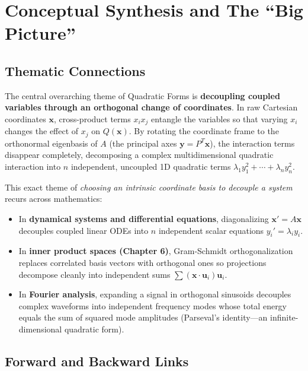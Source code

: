 \documentclass[11pt, letterpaper]{article}
\theoremstyle{definition}
\theoremstyle{remark}
\begin{document}
\newpage

\section{Conceptual Synthesis and The ``Big Picture''}

\subsection{Thematic Connections}

The central overarching theme of Quadratic Forms is \textbf{decoupling coupled variables through an orthogonal change of coordinates}. In raw Cartesian coordinates $\mathbf{x}$, cross-product terms $x_i x_j$ entangle the variables so that varying $x_i$ changes the effect of $x_j$ on $Q(\mathbf{x})$. By rotating the coordinate frame to the orthonormal eigenbasis of $A$ (the principal axes $\mathbf{y} = P^T \mathbf{x}$), the interaction terms disappear completely, decomposing a complex multidimensional quadratic interaction into $n$ independent, uncoupled 1D quadratic terms $\lambda_1 y_1^2 + \cdots + \lambda_n y_n^2$.

This exact theme of \emph{choosing an intrinsic coordinate basis to decouple a system} recurs across mathematics:
\begin{itemize}
    \item In \textbf{dynamical systems and differential equations}, diagonalizing $\mathbf{x}' = A\mathbf{x}$ decouples coupled linear ODEs into $n$ independent scalar equations $y_i' = \lambda_i y_i$.
    \item In \textbf{inner product spaces (Chapter 6)}, Gram-Schmidt orthogonalization replaces correlated basis vectors with orthogonal ones so projections decompose cleanly into independent sums $\sum (\mathbf{x}\cdot \mathbf{u}_i)\mathbf{u}_i$.
    \item In \textbf{Fourier analysis}, expanding a signal in orthogonal sinusoids decouples complex waveforms into independent frequency modes whose total energy equals the sum of squared mode amplitudes (Parseval's identity—an infinite-dimensional quadratic form).
\end{itemize}

\subsection{Forward and Backward Links}
\end{document}
